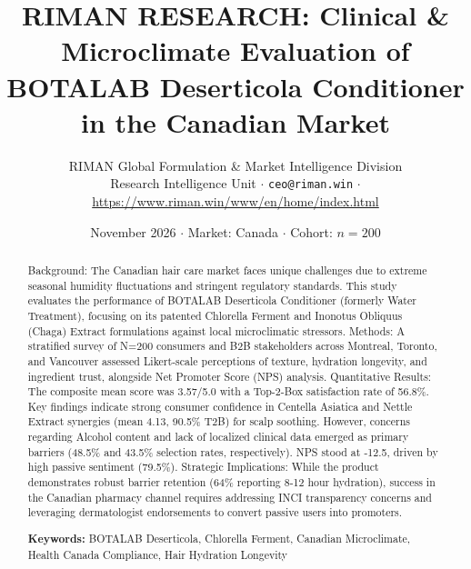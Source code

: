 \documentclass[10pt,twocolumn,a4paper]{article}
\title{\textbf{RIMAN RESEARCH: Clinical \& Microclimate Evaluation of BOTALAB Deserticola Conditioner in the Canadian Market}}
\author{RIMAN Global Formulation \& Market Intelligence Division\\
\small Research Intelligence Unit $\cdot$ \texttt{ceo@riman.win} $\cdot$ \url{https://www.riman.win/www/en/home/index.html}}
\date{November 2026 \quad $\cdot$ \quad Market: Canada \quad $\cdot$ \quad Cohort: $n = 200$}
\begin{document}
\maketitle

\begin{abstract}
Background: The Canadian hair care market faces unique challenges due to extreme seasonal humidity fluctuations and stringent regulatory standards. This study evaluates the performance of BOTALAB Deserticola Conditioner (formerly Water Treatment), focusing on its patented Chlorella Ferment and Inonotus Obliquus (Chaga) Extract formulations against local microclimatic stressors. Methods: A stratified survey of N=200 consumers and B2B stakeholders across Montreal, Toronto, and Vancouver assessed Likert-scale perceptions of texture, hydration longevity, and ingredient trust, alongside Net Promoter Score (NPS) analysis. Quantitative Results: The composite mean score was 3.57/5.0 with a Top-2-Box satisfaction rate of 56.8\%. Key findings indicate strong consumer confidence in Centella Asiatica and Nettle Extract synergies (mean 4.13, 90.5\% T2B) for scalp soothing. However, concerns regarding Alcohol content and lack of localized clinical data emerged as primary barriers (48.5\% and 43.5\% selection rates, respectively). NPS stood at -12.5, driven by high passive sentiment (79.5\%). Strategic Implications: While the product demonstrates robust barrier retention (64\% reporting 8-12 hour hydration), success in the Canadian pharmacy channel requires addressing INCI transparency concerns and leveraging dermatologist endorsements to convert passive users into promoters.

\vspace{0.4em}
\noindent\textbf{Keywords:} BOTALAB Deserticola, Chlorella Ferment, Canadian Microclimate, Health Canada Compliance, Hair Hydration Longevity
\end{abstract}
\end{document}
